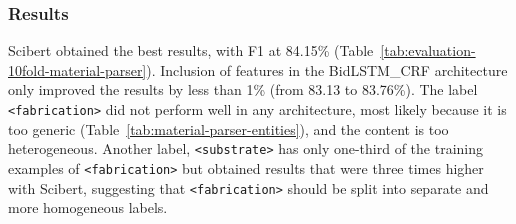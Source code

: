 \subsubsection{Results}

Scibert obtained the best results, with F1 at 84.15\% (Table~\ref{tab:evaluation-10fold-material-parser}).
Inclusion of features in the BidLSTM\_CRF architecture only improved the results by less than 1\% (from 83.13 to 83.76\%).
The label \texttt{<fabrication>} did not perform well in any architecture, most likely because it is too generic (Table~\ref{tab:material-parser-entities}), and the content is too heterogeneous. Another label, \texttt{<substrate>} has only one-third of the training examples of \texttt{<fabrication>} but obtained results that were three times higher with Scibert, suggesting that \texttt{<fabrication>} should be split into separate and more homogeneous labels.


